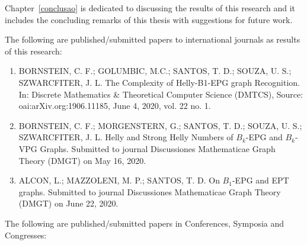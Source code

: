Chapter~\ref{conclusao} is dedicated to discussing the results of this research and it includes the concluding remarks of this thesis with suggestions for future work.


The following are  published/submitted papers to international journals  as results of this research:
 
\begin{enumerate}
    
     \item BORNSTEIN, C. F.; GOLUMBIC, M.C.; SANTOS, T. D.; SOUZA, U. S.; SZWARCFITER, J. L.  The Complexity of Helly-B1-EPG graph Recognition. In: Discrete Mathematics \& Theoretical Computer Science (DMTCS), Source: oai:arXiv.org:1906.11185, June 4, 2020,  vol. 22 no. 1. 
     
     \item BORNSTEIN, C. F.; MORGENSTERN, G.; SANTOS, T. D.; SOUZA, U. S.; SZWARCFITER, J. L.  Helly and Strong Helly Numbers of $B_k$-EPG and $B_k$-VPG Graphs. Submitted to journal Discussiones Mathematicae Graph Theory (DMGT) on  May 16, 2020. 
     \item ALCON, L.; MAZZOLENI, M. P.;  SANTOS, T. D. On $B_1$-EPG  and EPT graphs. Submitted to journal Discussiones Mathematicae Graph Theory (DMGT) on June 22, 2020.
\end{enumerate}

The following are  published/submitted papers in Conferences, Symposia and Congresses: 

